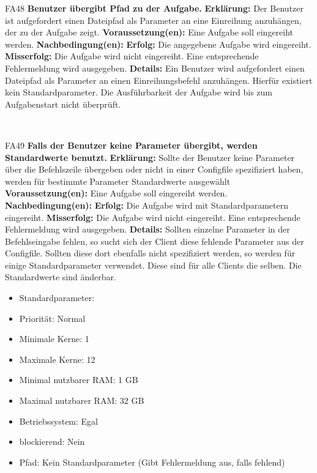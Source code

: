 \documentclass[a4paper,12pt]{article}
\begin{document}
\begin{itemize}[nosep]
	\begin{minipage}[t]{\linewidth}
		\item[FA48] \textbf{\gls{Benutzer} übergibt Pfad zu der Aufgabe.}
		\subitem \textbf{Erklärung:} Der \gls{Benutzer} ist aufgefordert einen Dateipfad als Parameter an eine Einreihung anzuhängen, der zu der Aufgabe zeigt.
		\subitem \textbf{Voraussetzung(en):} Eine Aufgabe soll eingereiht werden.
		\subitem \textbf{Nachbedingung(en):}
		\subsubitem \textbf{Erfolg:} Die angegebene Aufgabe wird eingereiht.
		\subsubitem \textbf{Misserfolg:} Die Aufgabe wird nicht eingereiht. Eine entsprechende Fehlermeldung wird ausgegeben.
		\subitem \textbf{Details:} Ein \gls{Benutzer} wird aufgefordert einen Dateipfad als Parameter an einen Einreihungsbefehl anzuhängen. Hierfür existiert kein Standardparameter. Die Ausführbarkeit der Aufgabe wird bis zum Aufgabenstart nicht überprüft.
	\end{minipage}
	\newline
	\\
	
	\begin{minipage}[t]{\linewidth}
		\item[FA49] \textbf{Falls der \gls{Benutzer} keine Parameter übergibt, werden Standardwerte benutzt.}
		\subitem \textbf{Erklärung:} Sollte der \gls{Benutzer} keine Parameter über die Befehlszeile übergeben oder nicht in einer Configfile spezifiziert haben, werden für bestimmte Parameter Standardwerte ausgewählt
		\subitem \textbf{Voraussetzung(en):} Eine Aufgabe soll eingereiht werden.
		\subitem \textbf{Nachbedingung(en):}
		\subsubitem \textbf{Erfolg:} Die Aufgabe wird mit Standardparametern eingereiht.
		\subsubitem \textbf{Misserfolg:} Die Aufgabe wird nicht eingereiht. Eine entsprechende Fehlermeldung wird ausgegeben.
		\subitem \textbf{Details:} Sollten einzelne Parameter in der Befehlseingabe fehlen, so sucht sich der \gls{Client} diese fehlende Parameter aus der Configfile. Sollten diese dort ebenfalls nicht spezifiziert werden, so werden für einige Standardparameter verwendet.
		Diese sind für alle \glspl{Client} die selben. Die Standardwerte sind änderbar.
		\begin{itemize}[nosep,label={}]
			\item Standardparameter:
			\item Priorität: Normal
			\item Minimale Kerne: 1
			\item Maximale Kerne: 12
			\item Minimal nutzbarer RAM: 1 GB
			\item Maximal nutzbarer RAM: 32 GB
			\item Betriebssystem: Egal
			\item blockierend: Nein
			\item Pfad: Kein Standardparameter (Gibt Fehlermeldung aus, falls fehlend)
	\end{itemize}
	\end{minipage}
	\newline
	\\
	

\end{itemize}
\end{document}
